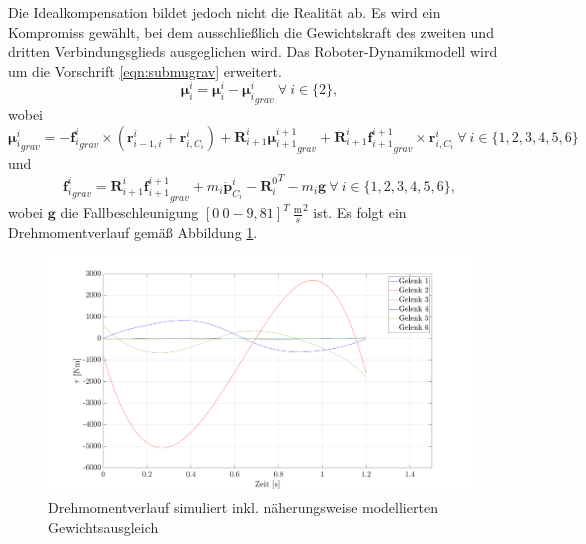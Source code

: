 %
Die Idealkompensation bildet jedoch nicht die Realität ab. Es wird ein Kompromiss gewählt, bei dem ausschließlich die  Gewichtskraft des zweiten und dritten Verbindungsglieds ausgeglichen wird. Das Roboter-Dynamikmodell wird um die Vorschrift \ref{eqn:submugrav} erweitert.
%
\begin{equation}
	\label{eqn:submugrav}
\bm{\mu}^{i}_{i} = \bm{\mu}^{i}_{i} - {\bm{\mu}^{i}_{i}}_{grav} ~\forall ~i \in \{2\}, 
\end{equation}
%
wobei
%
\begin{equation}
	\label{eqn:mugrav}
	{\bm{\mu}^{i}_{i}}_{grav} = -{\bm{f}^{i}_{i}}_{grav} \times \left( \bm{r}^{i}_{i-1,i} + \bm{r}^{i}_{i,C_i} \right) + \bm{R}^{i}_{i+1} {\bm{\mu}^{i+1}_{i+1}}_{grav} + \bm{R}^{i}_{i+1} {\bm{f}^{i+1}_{i+1}}_{grav} \times \bm{r}^{i}_{i,C_i} ~\forall ~i \in \{1,2,3,4,5,6\}
\end{equation}
%
und 
%
\begin{equation}
	\label{eqn:subfgrav}
	{\bm{f}^{i}_{i}}_{grav} = \bm{R}^{i}_{i+1} {\bm{f}^{i+1}_{i+1}}_{grav} + m_i\ddot{\bm{p}}^{i}_{C_i} - {\bm{R}^0_i}^T - m_i \bm{g} ~\forall ~i \in \{1,2,3,4,5,6\},
\end{equation}
%
wobei $\bm{g}$ die Fallbeschleunigung $[0~0-9,81]^T ~\frac{\text{m}}{s}^2$ ist.
Es folgt ein Drehmomentverlauf gemäß Abbildung \ref{fig:taumat-fg}. 
%
\begin{figure}[tbph]
	\centering
	\includegraphics[width=0.9\linewidth]{images/taumat-fg}
	\caption{Drehmomentverlauf simuliert inkl. näherungsweise modellierten Gewichtsausgleich}
	\label{fig:taumat-fg}
\end{figure}
%
%
